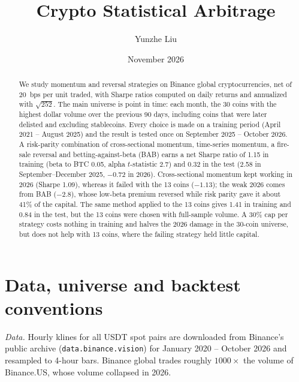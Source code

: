\documentclass[aps,prl,onecolumn,superscriptaddress,nofootinbib]{revtex4-2}
\begin{document}
	\title{Crypto Statistical Arbitrage}
	\author{Yunzhe Liu}
	\date{November 2026}

	\begin{abstract}
		We study momentum and reversal strategies on Binance global cryptocurrencies, net of 20~bps per unit traded, with Sharpe ratios computed on daily returns and annualized with $\sqrt{252}$. The main universe is point in time: each month, the 30 coins with the highest dollar volume over the previous 90 days, including coins that were later delisted and excluding stablecoins. Every choice is made on a training period (April 2021 -- August 2025) and the result is tested once on September 2025 -- October 2026. A risk-parity combination of cross-sectional momentum, time-series momentum, a fire-sale reversal and betting-against-beta (BAB) earns a net Sharpe ratio of 1.15 in training (beta to BTC 0.05, alpha $t$-statistic 2.7) and 0.32 in the test (2.58 in September--December 2025, $-0.72$ in 2026). Cross-sectional momentum kept working in 2026 (Sharpe 1.09), whereas it failed with the 13 coins ($-1.13$); the weak 2026 comes from BAB ($-2.8$), whose low-beta premium reversed while risk parity gave it about 41\% of the capital. The same method applied to the 13 coins gives 1.41 in training and 0.84 in the test, but the 13 coins were chosen with full-sample volume. A 30\% cap per strategy costs nothing in training and halves the 2026 damage in the 30-coin universe, but does not help with 13 coins, where the failing strategy held little capital.
	\end{abstract}%

	\maketitle


	\section{Data, universe and backtest conventions}
	\label{sec:data}

	\textit{Data.} Hourly klines for all USDT spot pairs are downloaded from Binance's public archive (\texttt{data.binance.vision}) for January 2020 -- October 2026 and resampled to 4-hour bars. Binance global trades roughly $1000\times$ the volume of Binance.US, whose volume collapsed in 2026.
\end{document}
